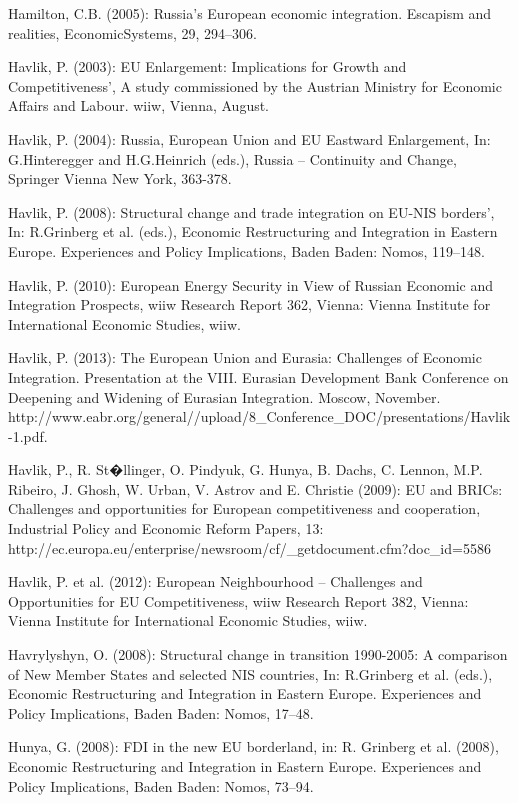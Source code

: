 Hamilton, C.B. (2005): Russia's European economic integration. Escapism and realities, EconomicSystems, 29, 294--306.

Havlik, P. (2003): EU Enlargement: Implications for Growth and Competitiveness', A study commissioned by the Austrian Ministry for Economic Affairs and Labour. wiiw, Vienna, August.

Havlik, P. (2004): Russia, European Union and EU Eastward Enlargement, In: G.Hinteregger and H.G.Heinrich (eds.), Russia -- Continuity and Change, Springer Vienna New York, 363-378.

Havlik, P. (2008): Structural change and trade integration on EU-NIS borders', In: R.Grinberg et al. (eds.), Economic Restructuring and Integration in Eastern Europe. Experiences and Policy Implications, Baden Baden: Nomos, 119--148.

Havlik, P. (2010): European Energy Security in View of Russian Economic and Integration Prospects, wiiw Research Report 362, Vienna: Vienna Institute for International Economic Studies, wiiw.

Havlik, P. (2013): The European Union and Eurasia: Challenges of Economic Integration. Presentation at the VIII. Eurasian Development Bank Conference on Deepening and Widening of Eurasian Integration. Moscow, November. http://www.eabr.org/general//upload/8\_Conference\_DOC/presentations/Havlik-1.pdf. 

Havlik, P., R. St�llinger, O. Pindyuk, G. Hunya, B. Dachs, C. Lennon, M.P. Ribeiro, J. Ghosh, W. Urban, V. Astrov and E. Christie (2009): EU and BRICs: Challenges and opportunities for European competitiveness and cooperation, Industrial Policy and Economic Reform Papers, 13: http://ec.europa.eu/enterprise/newsroom/cf/\_getdocument.cfm?doc\_id=5586

Havlik, P. et al. (2012): European Neighbourhood -- Challenges and Opportunities for EU Competitiveness, wiiw Research Report 382, Vienna: Vienna Institute for International Economic Studies, wiiw.

Havrylyshyn, O. (2008): Structural change in transition 1990-2005: A comparison of New Member States and selected NIS countries, In: R.Grinberg et al. (eds.), Economic Restructuring and Integration in Eastern Europe. Experiences and Policy Implications, Baden Baden: Nomos, 17--48.

Hunya, G. (2008): FDI in the new EU borderland, in: R. Grinberg et al. (2008), Economic Restructuring and Integration in Eastern Europe. Experiences and Policy Implications, Baden Baden: Nomos, 73--94.

